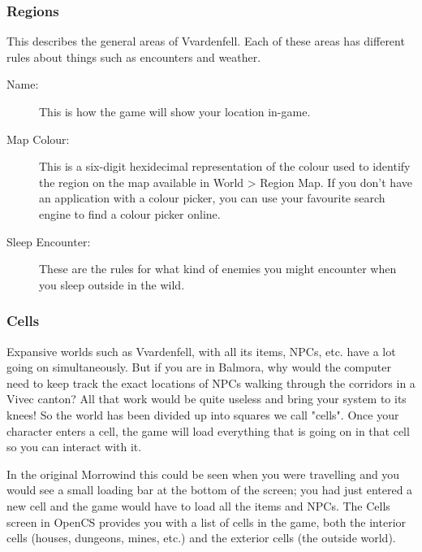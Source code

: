 \subsubsection{Regions}

This describes the general areas of Vvardenfell. Each of these areas has different rules about things such as encounters and weather.

\begin{description}
 \item[Name:] This is how the game will show your location in-game.
 \item[Map Colour:] This is a six-digit hexidecimal representation of the colour used to identify the region on the map available in World > Region Map. If you don't have an application with a colour picker, you can use your favourite search engine to find a colour picker online.
 \item[Sleep Encounter:] These are the rules for what kind of enemies you might encounter when you sleep outside in the wild.
\end{description}

\subsubsection{Cells}

Expansive worlds such as Vvardenfell, with all its items, NPCs, etc. have a lot going on simultaneously. But if you are in Balmora, why would the computer need to keep track the exact locations of NPCs walking through the corridors in a Vivec canton? All that work would be quite useless and bring your system to its knees! So the world has been divided up into squares we call "cells". Once your character enters a cell, the game will load everything that is going on in that cell so you can interact with it.

In the original Morrowind this could be seen when you were travelling and you would see a small loading bar at the bottom of the screen; you had just entered a new cell and the game would have to load all the items and NPCs. The Cells screen in OpenCS provides you with a list of cells in the game, both the interior cells (houses, dungeons, mines, etc.) and the exterior cells (the outside world).

